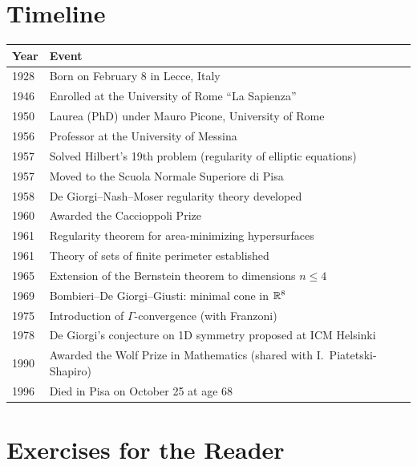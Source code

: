 \section*{Timeline}
\begin{tabularx}{\linewidth}{|p{1.5cm}|>{\raggedright\arraybackslash}X|}
\hline
\textbf{Year} & \textbf{Event} \\ \hline
1928 & Born on February 8 in Lecce, Italy \\ \hline
1946 & Enrolled at the University of Rome ``La Sapienza'' \\ \hline
1950 & Laurea (PhD) under Mauro Picone, University of Rome \\ \hline
1956 & Professor at the University of Messina \\ \hline
1957 & Solved Hilbert's 19th problem (regularity of elliptic equations) \\ \hline
1957 & Moved to the Scuola Normale Superiore di Pisa \\ \hline
1958 & De Giorgi--Nash--Moser regularity theory developed \\ \hline
1960 & Awarded the Caccioppoli Prize \\ \hline
1961 & Regularity theorem for area-minimizing hypersurfaces \\ \hline
1961 & Theory of sets of finite perimeter established \\ \hline
1965 & Extension of the Bernstein theorem to dimensions \(n \leq 4\) \\ \hline
1969 & Bombieri--De Giorgi--Giusti: minimal cone in \(\mathbb{R}^8\) \\ \hline
1975 & Introduction of \(\Gamma\)-convergence (with Franzoni) \\ \hline
1978 & De Giorgi's conjecture on 1D symmetry proposed at ICM Helsinki \\ \hline
1990 & Awarded the Wolf Prize in Mathematics (shared with I.\ Piatetski-Shapiro) \\ \hline
1996 & Died in Pisa on October 25 at age 68 \\ \hline
\end{tabularx}

\section*{Exercises for the Reader}

